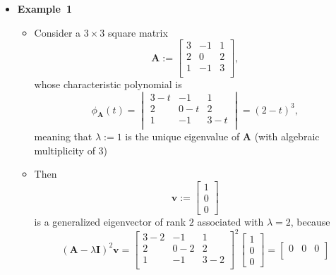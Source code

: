 \documentclass[12pt,a4paper]{article}
\begin{document}
\begin{itemize}
\item \textbf{Example~1}
  \begin{itemize}
  \item Consider a $3\times 3$ square matrix
    \begin{equation}\nonumber%
      \bm{A} :=
      \begin{bmatrix}
        3 & -1 & 1 \\
        2 & 0 & 2 \\
        1 & -1 & 3 \\
      \end{bmatrix},
    \end{equation}
    whose characteristic polynomial is
    \begin{equation}\nonumber%
      \phi_{\bm{A}}(t) =
      \begin{vmatrix}
        3-t & -1 & 1 \\
        2 & 0-t & 2 \\
        1 & -1 & 3-t \\
      \end{vmatrix}
      = (2-t)^{3},
    \end{equation}
    meaning that $\lambda:=1$ is the unique eigenvalue of $\bm{A}$ (with algebraic multiplicity of $3$)
  \item Then
    \begin{equation}\nonumber%
      \bm{v} :=
      \begin{bmatrix}
        1 \\ 0 \\ 0
      \end{bmatrix}
    \end{equation}
    is a generalized eigenvector of rank $2$ associated with $\lambda=2$,
    because
    \begin{equation}\nonumber%
      (\bm{A}-\lambda\bm{I})^{2}\bm{v} = 
      \begin{bmatrix}
        3-2 & -1 & 1 \\
        2 & 0-2 & 2 \\
        1 & -1 & 3-2 \\
      \end{bmatrix}^{2}
      \begin{bmatrix}
        1 \\ 0 \\ 0
      \end{bmatrix}
      = 
      \begin{bmatrix}
        0 & 0 & 0 \\

\end{bmatrix}
\end{equation}
\end{itemize}
\end{itemize}
\end{document}
